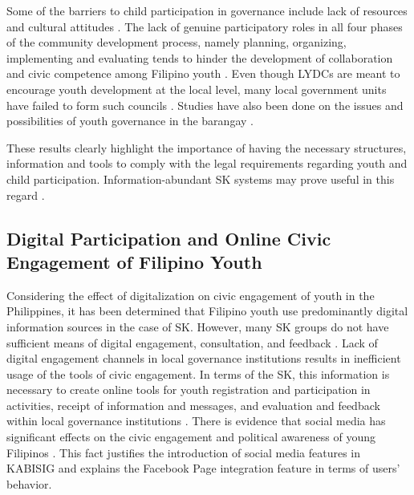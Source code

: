 \hspace*{\parindent}Some of the barriers to child participation in governance include lack of resources and cultural attitudes \cite{Q,AK}. The lack of genuine participatory roles in all four phases of the community development process, namely planning, organizing, implementing and evaluating tends to hinder the development of collaboration and civic competence among Filipino youth \cite{Q}. Even though LYDCs are meant to encourage youth development at the local level, many local government units have failed to form such councils \cite{T}. Studies have also been done on the issues and possibilities of youth governance in the barangay \cite{AN}.
\vspace{5mm}

\hspace*{\parindent}These results clearly highlight the importance of having the necessary structures, information and tools to comply with the legal requirements regarding youth and child participation. Information-abundant SK systems may prove useful in this regard \cite{Q,S,AK,AN}.
\vspace{5mm}

\subsection{Digital Participation and Online Civic Engagement of Filipino Youth}

\hspace*{\parindent}Considering the effect of digitalization on civic engagement of youth in the Philippines, it has been determined that Filipino youth use predominantly digital information sources in the case of SK. However, many SK groups do not have sufficient means of digital engagement, consultation, and feedback \cite{T}. Lack of digital engagement channels in local governance institutions results in inefficient usage of the tools of civic engagement. In terms of the SK, this information is necessary to create online tools for youth registration and participation in activities, receipt of information and messages, and evaluation and feedback within local governance institutions \cite{Q,T}. There is evidence that social media has significant effects on the civic engagement and political awareness of young Filipinos \cite{AD}. This fact justifies the introduction of social media features in KABISIG and explains the Facebook Page integration feature in terms of users' behavior.
\vspace{5mm}

